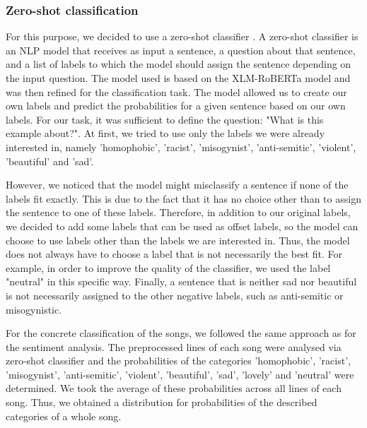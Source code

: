 \subsubsection*{Zero-shot classification}
For this purpose, we decided to use a zero-shot classifier \cite{zero-shot}. A zero-shot classifier is an NLP model that receives as input a sentence, a question about that sentence, and a list of labels to which the model should assign the sentence depending on the input question. The model used is based on the XLM-RoBERTa model \cite{roberta} and was then refined for the classification task. The model allowed us to create our own labels and predict the probabilities for a given sentence based on our own labels. For our task, it was sufficient to define the question: "What is this example about?". At first, we tried to use only the labels we were already interested in, namely 'homophobic', 'racist', 'misogynist', 'anti-semitic', 'violent', 'beautiful' and 'sad'. 

However, we noticed that the model might misclassify a sentence if none of the labels fit exactly. This is due to the fact that it has no choice other than to assign the sentence to one of these labels. Therefore, in addition to our original labels, we decided to add some labels that can be used as offset labels, so the model can choose to use labels other than the labels we are interested in. Thus, the model does not always have to choose a label that is not necessarily the best fit. For example, in order to improve the quality of the classifier, we used the label "neutral" in this specific way. Finally, a sentence that is neither sad nor beautiful is not necessarily assigned to the other negative labels, such as anti-semitic or misogynistic.

For the concrete classification of the songs, we followed the same approach as for the sentiment analysis. The preprocessed lines of each song were analysed via zero-shot classifier and the probabilities of the categories 'homophobic', 'racist', 'misogynist', 'anti-semitic', 'violent', 'beautiful', 'sad', 'lovely' and 'neutral' were determined. We took the average of these probabilities across all lines of each song. Thus, we obtained a distribution for probabilities of the described categories of a whole song.

